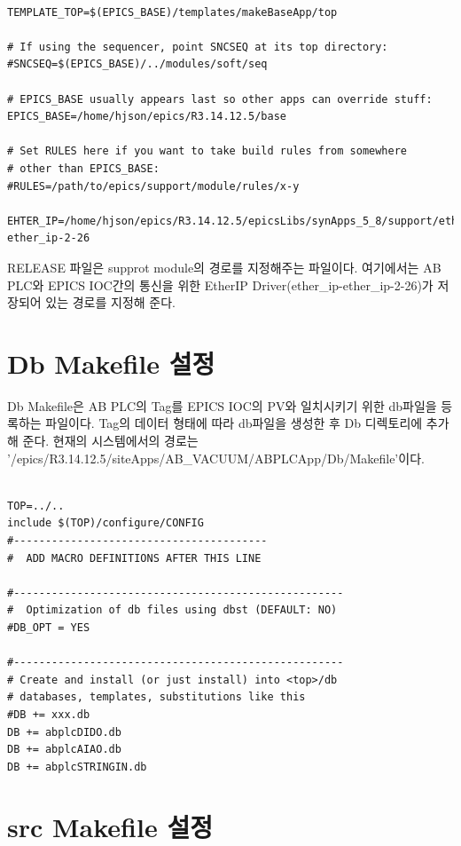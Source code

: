 \documentclass[11pt
  , a4paper
  , article
  , oneside
]{memoir}
\begin{document}
\begin{lstlisting}[style=termstyle]

TEMPLATE_TOP=$(EPICS_BASE)/templates/makeBaseApp/top

# If using the sequencer, point SNCSEQ at its top directory:
#SNCSEQ=$(EPICS_BASE)/../modules/soft/seq

# EPICS_BASE usually appears last so other apps can override stuff:
EPICS_BASE=/home/hjson/epics/R3.14.12.5/base

# Set RULES here if you want to take build rules from somewhere
# other than EPICS_BASE:
#RULES=/path/to/epics/support/module/rules/x-y

EHTER_IP=/home/hjson/epics/R3.14.12.5/epicsLibs/synApps_5_8/support/ether_ip-ether_ip-2-26

\end{lstlisting}

RELEASE 파일은 supprot module의 경로를 지정해주는 파일이다. 여기에서는 AB PLC와 EPICS IOC간의 통신을 위한 EtherIP Driver(ether\_ip-ether\_ip-2-26)가 저장되어 있는 경로를 지정해 준다.\

\section{Db Makefile 설정}

Db Makefile은 AB PLC의 Tag를 EPICS IOC의 PV와 일치시키기 위한 db파일을 등록하는 파일이다. Tag의 데이터 형태에 따라 db파일을 생성한 후 Db 디렉토리에 추가해 준다. 현재의 시스템에서의 경로는 '/epics/R3.14.12.5/siteApps/AB\_VACUUM/ABPLCApp/Db/Makefile'이다.\
 
\begin{lstlisting}[style=termstyle]

TOP=../..
include $(TOP)/configure/CONFIG
#----------------------------------------
#  ADD MACRO DEFINITIONS AFTER THIS LINE

#----------------------------------------------------
#  Optimization of db files using dbst (DEFAULT: NO)
#DB_OPT = YES

#----------------------------------------------------
# Create and install (or just install) into <top>/db
# databases, templates, substitutions like this
#DB += xxx.db
DB += abplcDIDO.db
DB += abplcAIAO.db
DB += abplcSTRINGIN.db

\end{lstlisting}

\section{src Makefile 설정}
\end{document}
